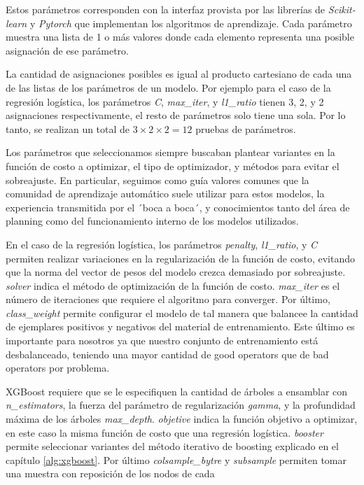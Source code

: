 Estos parámetros corresponden con la interfaz provista por las librerías de
\emph{Scikit-learn} y \emph{Pytorch} que implementan los algoritmos de aprendizaje. Cada parámetro muestra una lista de 1 o más valores donde cada elemento representa una posible asignación de ese parámetro.

La cantidad de asignaciones posibles es igual al producto cartesiano de cada una de las listas de los parámetros de un modelo. Por ejemplo para el caso de la regresión
logística, los parámetros \emph{C}, \emph{max\_iter}, y \emph{l1\_ratio} tienen 3, 2, y 2 asignaciones respectivamente, el resto de parámetros solo tiene una sola. Por lo tanto, se realizan un total de $3 \times 2 \times 2 = 12$ pruebas de parámetros.

Los parámetros que seleccionamos siempre buscaban plantear variantes en la función de costo a optimizar, el tipo de optimizador, y métodos para evitar el sobreajuste. En particular, seguimos como guía valores comunes que la comunidad de aprendizaje automático suele utilizar para estos modelos,  la experiencia transmitida por el ´boca a boca´, y conocimientos tanto del área de planning como del funcionamiento interno de los modelos utilizados. 

En el caso de la regresión logística, los parámetros \emph{penalty},
\emph{l1\_ratio}, y \emph{C} permiten realizar variaciones en la regularización
de la función de costo, evitando que la norma del vector de pesos del modelo
crezca demasiado por sobreajuste. \emph{solver} indica el método de optimización de la función de costo. \emph{max\_iter} es el número
de iteraciones que requiere el algoritmo para converger. Por último,
\emph{class\_weight} permite configurar el modelo de tal manera que balancee
la cantidad de ejemplares positivos y negativos del material de entrenamiento. Este último es importante para nosotros ya que nuestro conjunto de entrenamiento está desbalanceado, teniendo una mayor cantidad de good operators que de
bad operators por problema.

XGBoost requiere que se le especifiquen la cantidad de árboles a
ensamblar con \emph{n\_estimators}, la fuerza del parámetro de regularización
\emph{gamma}, y la profundidad máxima de los árboles \emph{max\_depth}. \emph{objetive} indica la función objetivo a optimizar, en este caso la misma función de costo que una regresión logística. \emph{booster} permite seleccionar variantes del método iterativo de boosting explicado en el capítulo \ref{alg:xgboost}. Por último \emph{colsample\_bytre} y \emph{subsample} permiten
tomar una muestra con reposición de los nodos de cada

